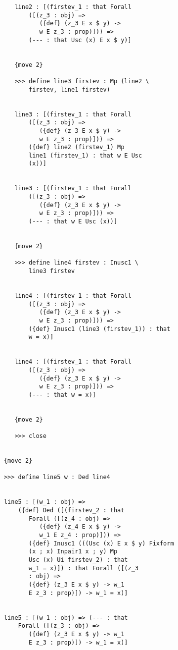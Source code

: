 \documentclass[12pt]{article}
\begin{document}
\begin{verbatim}
         line2 : [(firstev_1 : that Forall 
             ([(z_3 : obj) => 
                ({def} (z_3 E x $ y) -> 
                w E z_3 : prop)])) => 
             (--- : that Usc (x) E x $ y)]


         {move 2}

         >>> define line3 firstev : Mp (line2 \
             firstev, line1 firstev)


         line3 : [(firstev_1 : that Forall 
             ([(z_3 : obj) => 
                ({def} (z_3 E x $ y) -> 
                w E z_3 : prop)])) => 
             ({def} line2 (firstev_1) Mp 
             line1 (firstev_1) : that w E Usc 
             (x))]


         line3 : [(firstev_1 : that Forall 
             ([(z_3 : obj) => 
                ({def} (z_3 E x $ y) -> 
                w E z_3 : prop)])) => 
             (--- : that w E Usc (x))]


         {move 2}

         >>> define line4 firstev : Inusc1 \
             line3 firstev


         line4 : [(firstev_1 : that Forall 
             ([(z_3 : obj) => 
                ({def} (z_3 E x $ y) -> 
                w E z_3 : prop)])) => 
             ({def} Inusc1 (line3 (firstev_1)) : that 
             w = x)]


         line4 : [(firstev_1 : that Forall 
             ([(z_3 : obj) => 
                ({def} (z_3 E x $ y) -> 
                w E z_3 : prop)])) => 
             (--- : that w = x)]


         {move 2}

         >>> close


      {move 2}

      >>> define line5 w : Ded line4


      line5 : [(w_1 : obj) => 
          ({def} Ded ([(firstev_2 : that 
             Forall ([(z_4 : obj) => 
                ({def} (z_4 E x $ y) -> 
                w_1 E z_4 : prop)])) => 
             ({def} Inusc1 (((Usc (x) E x $ y) Fixform 
             (x ; x) Inpair1 x ; y) Mp 
             Usc (x) Ui firstev_2) : that 
             w_1 = x)]) : that Forall ([(z_3 
             : obj) => 
             ({def} (z_3 E x $ y) -> w_1 
             E z_3 : prop)]) -> w_1 = x)]


      line5 : [(w_1 : obj) => (--- : that 
          Forall ([(z_3 : obj) => 
             ({def} (z_3 E x $ y) -> w_1 
             E z_3 : prop)]) -> w_1 = x)]



\end{verbatim}
\end{document}
